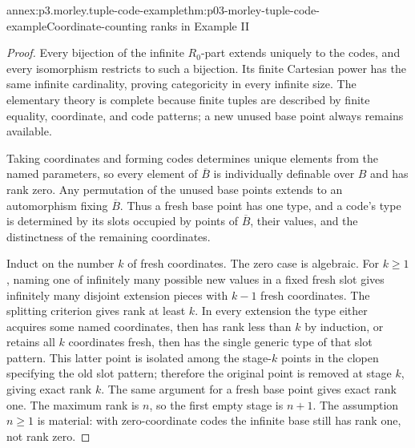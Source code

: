 \begin{annexitem}{annex:p3.morley.tuple-code-example}{thm:p03-morley-tuple-code-example}{Coordinate-counting ranks in Example II}
\begin{proof}
Every bijection of the infinite \(R_0\)-part extends
uniquely to the codes, and every isomorphism restricts
to such a bijection. Its finite Cartesian power has the
same infinite cardinality, proving categoricity in
every infinite size. The elementary theory is complete
because finite tuples are described by finite equality,
coordinate, and code patterns; a new unused base point
always remains available.

Taking coordinates and forming codes determines unique
elements from the named parameters, so every element
of \(\overline B\) is individually definable over
\(B\) and has rank zero. Any permutation of the unused
base points extends to an automorphism fixing
\(\overline B\). Thus a fresh base point has one type,
and a code's type is determined by its slots occupied
by points of \(\overline B\), their values, and the
distinctness of the remaining coordinates.

Induct on the number \(k\) of fresh coordinates.
The zero case is algebraic. For \(k\geq1\), naming
one of infinitely many possible new values in a fixed
fresh slot gives infinitely many disjoint extension
pieces with \(k-1\) fresh coordinates. The splitting
criterion gives rank at least \(k\). In every
extension the type either acquires some named
coordinates, then has rank less than \(k\) by
induction, or retains all \(k\) coordinates fresh,
then has the single generic type of that slot pattern.
This latter point is isolated among the stage-\(k\)
points in the clopen specifying the old slot pattern;
therefore the original point is removed at stage
\(k\), giving exact rank \(k\). The same argument
for a fresh base point gives exact rank one.
The maximum rank is \(n\), so the first empty stage
is \(n+1\). The assumption \(n\geq1\) is material:
with zero-coordinate codes the infinite base still
has rank one, not rank zero.
\end{proof}
\end{annexitem}

